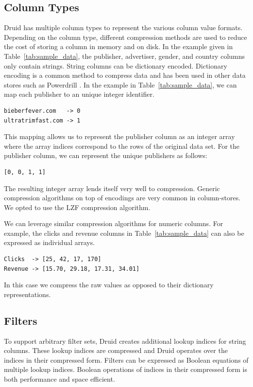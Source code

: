 \documentclass{vldb}
\begin{document}
\subsection{Column Types}
Druid has multiple column types to represent the various column value
formats. Depending on the column type, different compression methods
are used to reduce the cost of storing a column in memory and on
disk. In the example given in Table~\ref{tab:sample_data}, the
publisher, advertiser, gender, and country columns only contain
strings. String columns can be dictionary encoded. Dictionary encoding
is a common method to compress data and has been used in other data
stores such as Powerdrill \cite{hall2012processing}. In the example in
Table~\ref{tab:sample_data}, we can map each publisher to an unique
integer identifier.
\begin{verbatim}
bieberfever.com   -> 0
ultratrimfast.com -> 1
\end{verbatim}
This mapping allows us to represent the publisher column as an integer
array where the array indices correspond to the rows of the original
data set. For the publisher column, we can represent the unique
publishers as follows:
\begin{verbatim}
[0, 0, 1, 1]
\end{verbatim}

The resulting integer array lends itself very well to
compression. Generic compression algorithms on top of encodings are
very common in column-stores. We opted to use the LZF \cite{liblzf2013} compression
algorithm.

We can leverage similar compression algorithms for numeric
columns. For example, the clicks and revenue columns in
Table~\ref{tab:sample_data} can also be expressed as individual
arrays.
\begin{verbatim}
Clicks  -> [25, 42, 17, 170]
Revenue -> [15.70, 29.18, 17.31, 34.01]
\end{verbatim}
In this case we compress the raw values as opposed to their dictionary
representations.

\subsection{Filters}
To support arbitrary filter sets, Druid creates additional lookup
indices for string columns. These lookup indices are compressed and
Druid operates over the indices in their compressed form. Filters can
be expressed as Boolean equations of multiple lookup indices. Boolean
operations of indices in their compressed form is both performance and
space efficient.
\end{document}
